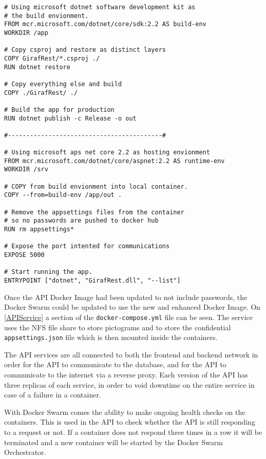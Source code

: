 \begin{lstlisting}[caption={API Dockerfile},captionpos=b,label=APIDockerfile,escapechar=\%]
# Using microsoft dotnet software development kit as
# the build envionment.
FROM mcr.microsoft.com/dotnet/core/sdk:2.2 AS build-env
WORKDIR /app

# Copy csproj and restore as distinct layers
COPY GirafRest/*.csproj ./
RUN dotnet restore

# Copy everything else and build
COPY ./GirafRest/ ./

# Build the app for production
RUN dotnet publish -c Release -o out

#------------------------------------------#

# Using microsoft aps net core 2.2 as hosting envionment
FROM mcr.microsoft.com/dotnet/core/aspnet:2.2 AS runtime-env
WORKDIR /srv

# COPY from build envionment into local container.
COPY --from=build-env /app/out .

# Remove the appsettings files from the container
# so no passwords are pushed to docker hub
RUN rm appsettings*

# Expose the port intented for communications
EXPOSE 5000

# Start running the app.
ENTRYPOINT ["dotnet", "GirafRest.dll", "--list"]
\end{lstlisting}

Once the API Docker Image had been updated to not include passwords, the Docker Swarm could be updated to use the new and enhanced Docker Image.
On \autoref{APIService} a section of the \lstinline$docker-compose.yml$ file can be seen.
The service uses the NFS file share to store pictograms and to store the confidential \lstinline$appsettings.json$ file which is then mounted inside the containers.

The API services are all connected to both the frontend and backend network in order for the API to communicate to the database, and for the API to communicate to the internet via a reverse proxy.
Each version of the API has three replicas of each service, in order to void downtime on the entire service in case of a failure in a container.

With Docker Swarm comes the ability to make ongoing health checks on the containers.
This is used in the API to check whether the API is still responding to a request or not.
If a container does not respond three times in a row it will be terminated and a new container will be started by the Docker Swarm Orchestrator.

